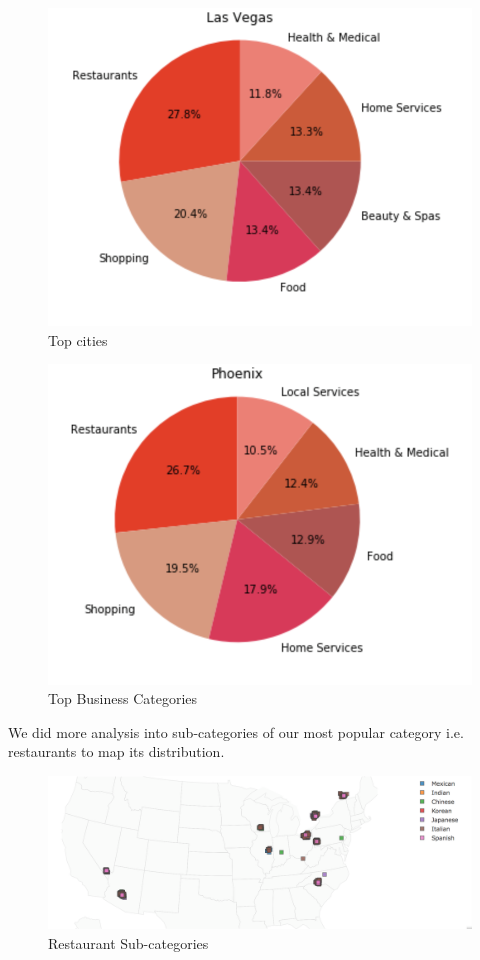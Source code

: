 \documentclass[11pt]{article}
\begin{document}
     	\begin{figure}[H]
     		\centering
     		\includegraphics[scale=0.7] {top_cities.png}
     		\caption{Top cities}
     	\end{figure}
	     \begin{figure}[H]
	     	\centering
	     	\includegraphics[scale=0.7] {top_categroies.png}
	     	\caption{Top Business Categories}
	     \end{figure}
     We did more analysis into sub-categories of our most popular category i.e. restaurants to map its distribution.
      \begin{figure}[H]
     	\centering
     	\includegraphics[scale=0.5] {category_map.png}
     	\caption{Restaurant Sub-categories}
     \end{figure}
      
\end{document}
